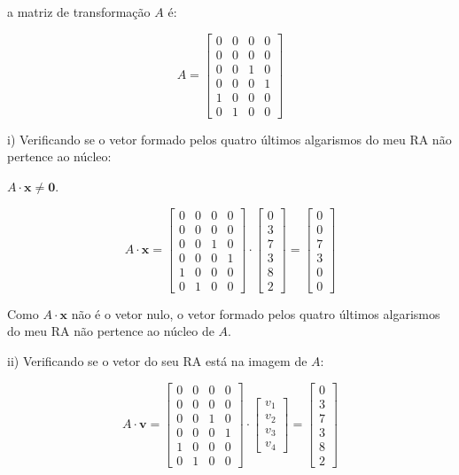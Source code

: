  a matriz de transformação \( A \) é:

\[ A = \begin{bmatrix} 0 & 0 & 0 & 0 \\ 0 & 0 & 0 & 0 \\ 0 & 0 & 1 & 0 \\ 0 & 0 & 0 & 1 \\ 1 & 0 & 0 & 0 \\ 0 & 1 & 0 & 0 \end{bmatrix} \]



i) Verificando se o vetor formado pelos quatro últimos algarismos do meu RA não pertence ao núcleo:

 \( A \cdot \mathbf{x} \neq \mathbf{0} \).

\[ A \cdot \mathbf{x} = \begin{bmatrix} 0 & 0 & 0 & 0 \\ 0 & 0 & 0 & 0 \\ 0 & 0 & 1 & 0 \\ 0 & 0 & 0 & 1 \\ 1 & 0 & 0 & 0 \\ 0 & 1 & 0 & 0 \end{bmatrix} \cdot \begin{bmatrix} 0 \\ 3 \\ 7 \\ 3 \\ 8 \\ 2 \end{bmatrix} = \begin{bmatrix} 0 \\ 0 \\ 7 \\ 3 \\ 0 \\ 0 \end{bmatrix} \]

Como \( A \cdot \mathbf{x} \) não é o vetor nulo, o vetor formado pelos quatro últimos algarismos do meu RA não pertence ao núcleo de \( A \).

ii) Verificando se o vetor do seu RA está na imagem de \( A \):


\[ A \cdot \mathbf{v} = \begin{bmatrix} 0 & 0 & 0 & 0 \\ 0 & 0 & 0 & 0 \\ 0 & 0 & 1 & 0 \\ 0 & 0 & 0 & 1 \\ 1 & 0 & 0 & 0 \\ 0 & 1 & 0 & 0 \end{bmatrix} \cdot \begin{bmatrix} v_1 \\ v_2 \\ v_3 \\ v_4 \end{bmatrix} = \begin{bmatrix} 0 \\ 3 \\ 7 \\ 3 \\ 8 \\ 2 \end{bmatrix} \]

